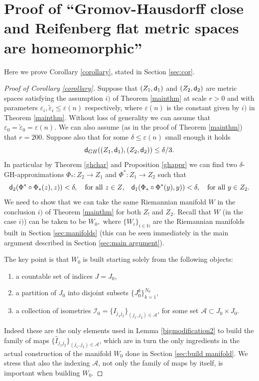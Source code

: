 \documentclass[11pt]{article}
\newcommand{\eps}{\varepsilon}
\newcommand{\nn}{\mathbb{N}}
\newcommand{\sfd}{{\sf d}}
\theoremstyle{plain}
\theoremstyle{definition}
\numberwithin{equation}{section}
\begin{document}
\section{Proof of  ``Gromov-Hausdorff close  and Reifenberg flat metric spaces are homeomorphic''}

Here we prove Corollary \ref{corollary}, stated in Section \ref{sec:cor}.
\begin{proof}[Proof of Corollary \ref{corollary}]
Suppose that $(Z_1,\sfd_1)$ and $(Z_2,\sfd_2)$ are metric spaces satisfying the assumption $i)$ of Theorem \ref{mainthm} at scale $r>0$ and with parameters  $\eps_i,\tilde \eps_i\le\eps(n)$ respectively, where $\eps(n)$ is the constant given by $i)$ in Theorem \ref{mainthm}.  Without loss of generality we can assume that $\eps_0=\tilde \eps_0=\eps(n).$ We can also assume (as in the proof of Theorem \ref{mainthm}) that $r=200$. Suppose also that for some $\delta\le\eps(n)$ small enough it holds
\[
\sfd_{GH}((Z_1,\sfd_1),(Z_2,\sfd_2))\le \delta/3.
\]
In particular by Theorem \ref{ghchar} and Proposition \ref{ghappr} we can find two $\delta$-GH-approximations $\Phi_*: Z_2\to Z_1$ and $\Phi^*:Z_1 \to Z_2$ such that
\begin{equation}\label{eq:phi*}
     \sfd_2(\Phi^*\circ \Phi_*(z),z))<\delta, \quad \text{for all $z\in Z$,} \quad   \sfd_1(\Phi_*\circ \Phi^*(y),y))<\delta, \quad \text{for all $y\in Z_2$.}
\end{equation}
We need to show that we can take the same Riemannian manifold $W$ in the conclusion $i)$ of Theorem \ref{mainthm} for both $Z_!$ and $Z_2$. 
Recall that  $W$ (in the case $i)$) can be taken to be $W_0,$ where $\{W_i\}_{i\in \nn}$ are the Riemannian manifolds built in Section \ref{sec:manifolds} (this can be seen immediately in the main argument described in Section \ref{sec:main argument}).

The key point is that $W_0$ is built starting solely from the following objects:
\begin{enumerate}[label=\roman*)]
    \item a countable set of indices $J= J_0$,
    \item a partition of $J_0$ into disjoint subsets $\{J_0^k\}_{k=1}^{N_0}$,
    \item a collection of isometries $\mathcal I_0=\{ I_{j_1j_2}\}_{(j_1,j_2)\in \mathcal A}$, for some set $\mathcal{A}\subset J_0\times J_0$. 
\end{enumerate}
Indeed these are the only elements used in Lemma \ref{bigmodification2} to build the family of maps $\{\hat I_{j_1j_2}\}_{(j_1,j_2)\in \mathcal A}$, which are in turn the only ingredients in the actual construction of the manifold $W_0$ done in Section \ref{sec:build manifold}. We stress that also the indexing $\mathcal A$, not only the family of maps by itself,  is important when building $W_0$. 


\end{proof}
\end{document}
